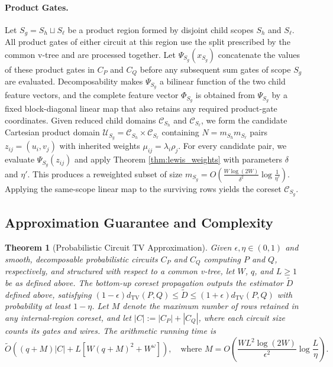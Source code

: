 \documentclass{article}
\newtheorem{theorem}{Theorem}[section]
\begin{document}
\paragraph{Product Gates.} Let $S_g = S_h \sqcup S_\ell$ be a product region formed by disjoint child scopes $S_h$ and $S_\ell$. All product gates of either circuit at this region use the split prescribed by the common v-tree and are processed together. Let $\Psi_{S_g}(x_{S_g})$ concatenate the values of these product gates in $C_P$ and $C_Q$ before any subsequent sum gates of scope $S_g$ are evaluated. Decomposability makes $\Psi_{S_g}$ a bilinear function of the two child feature vectors, and the complete feature vector $\Phi_{S_g}$ is obtained from $\Psi_{S_g}$ by a fixed block-diagonal linear map that also retains any required product-gate coordinates. Given reduced child domains $\mathcal{C}_{S_h}$ and $\mathcal{C}_{S_\ell}$, we form the candidate Cartesian product domain $\mathcal{U}_{S_g} = \mathcal{C}_{S_h} \times \mathcal{C}_{S_\ell}$ containing $N = m_{S_h} m_{S_\ell}$ pairs $z_{ij} = (u_i, v_j)$ with inherited weights $\mu_{ij} = \lambda_i \rho_j$. For every candidate pair, we evaluate $\Psi_{S_g}(z_{ij})$ and apply Theorem \ref{thm:lewis_weights} with parameters $\delta$ and $\eta'$. This produces a reweighted subset of size $m_{S_g} = O\left( \frac{W \log(2W)}{\delta^2} \log\frac{1}{\eta'} \right)$. Applying the same-scope linear map to the surviving rows yields the coreset $\mathcal C_{S_g}$.

\subsection{Approximation Guarantee and Complexity}

\begin{theorem}[Probabilistic Circuit TV Approximation]
\label{thm:pc_fpras}
Given $\epsilon, \eta \in (0, 1)$ and smooth, decomposable probabilistic circuits $C_P$ and $C_Q$ computing $P$ and $Q$, respectively, and structured with respect to a common v-tree, let $W$, $q$, and $L\geq1$ be as defined above. The bottom-up coreset propagation outputs the estimator $\widetilde{D}$ defined above, satisfying $(1-\epsilon)d_{\mathrm{TV}}(P,Q) \le \widetilde{D} \le (1+\epsilon)d_{\mathrm{TV}}(P,Q)$ with probability at least $1-\eta$. Let $M$ denote the maximum number of rows retained in any
internal-region coreset, and
let $|C|:=|C_P|+|C_Q|$, where each circuit size counts its gates and wires. The arithmetic running time is
\[
\widetilde{O}\!\left((q+M)|C|+L\left[W(q+M)^2+W^\omega\right]\right),
\quad\text{where }
M=O\!\left(
\frac{WL^2\log(2W)}{\epsilon^2}
\log\frac{L}{\eta}
\right).
\]
\end{theorem}
\end{document}
